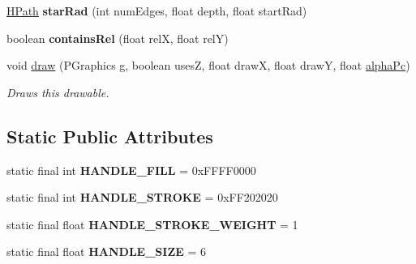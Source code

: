 \begin{DoxyCompactItemize}
\item 
\hypertarget{classhype_1_1extended_1_1drawable_1_1_h_path_a31b900ceb515728436ebe504ebbbeda1}{\hyperlink{classhype_1_1extended_1_1drawable_1_1_h_path}{H\-Path} {\bfseries star\-Rad} (int num\-Edges, float depth, float start\-Rad)}\label{classhype_1_1extended_1_1drawable_1_1_h_path_a31b900ceb515728436ebe504ebbbeda1}

\item 
\hypertarget{classhype_1_1extended_1_1drawable_1_1_h_path_ac8f128faad7c12a1a9b0878b9ce503d6}{boolean {\bfseries contains\-Rel} (float rel\-X, float rel\-Y)}\label{classhype_1_1extended_1_1drawable_1_1_h_path_ac8f128faad7c12a1a9b0878b9ce503d6}

\item 
void \hyperlink{classhype_1_1extended_1_1drawable_1_1_h_path_ad373de270293557c0e2ea5eb54903b3e}{draw} (P\-Graphics g, boolean uses\-Z, float draw\-X, float draw\-Y, float \hyperlink{classhype_1_1core_1_1drawable_1_1_h_drawable_ad4f0e4c9f93d810c66b39f1715625719}{alpha\-Pc})
\begin{DoxyCompactList}\small\item\em Draws this drawable. \end{DoxyCompactList}\end{DoxyCompactItemize}
\subsection*{Static Public Attributes}
\begin{DoxyCompactItemize}
\item 
\hypertarget{classhype_1_1extended_1_1drawable_1_1_h_path_acc639d9a868f1b2aee55fbedcb05ec71}{static final int {\bfseries H\-A\-N\-D\-L\-E\-\_\-\-F\-I\-L\-L} = 0x\-F\-F\-F\-F0000}\label{classhype_1_1extended_1_1drawable_1_1_h_path_acc639d9a868f1b2aee55fbedcb05ec71}

\item 
\hypertarget{classhype_1_1extended_1_1drawable_1_1_h_path_ac53a76846e735001afe403cacbf1b336}{static final int {\bfseries H\-A\-N\-D\-L\-E\-\_\-\-S\-T\-R\-O\-K\-E} = 0x\-F\-F202020}\label{classhype_1_1extended_1_1drawable_1_1_h_path_ac53a76846e735001afe403cacbf1b336}

\item 
\hypertarget{classhype_1_1extended_1_1drawable_1_1_h_path_a26d814cad78d489ee4f910bbfaa6b673}{static final float {\bfseries H\-A\-N\-D\-L\-E\-\_\-\-S\-T\-R\-O\-K\-E\-\_\-\-W\-E\-I\-G\-H\-T} = 1}\label{classhype_1_1extended_1_1drawable_1_1_h_path_a26d814cad78d489ee4f910bbfaa6b673}

\item 
\hypertarget{classhype_1_1extended_1_1drawable_1_1_h_path_a40108f70fe1b4f70d2bcd98513d55f43}{static final float {\bfseries H\-A\-N\-D\-L\-E\-\_\-\-S\-I\-Z\-E} = 6}\label{classhype_1_1extended_1_1drawable_1_1_h_path_a40108f70fe1b4f70d2bcd98513d55f43}

\end{DoxyCompactItemize}
